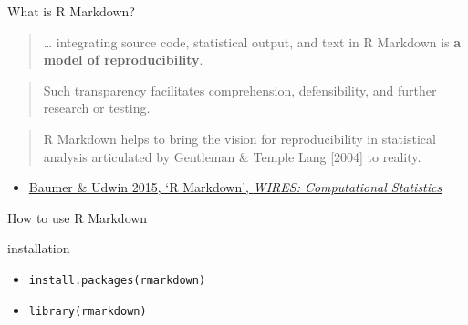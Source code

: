 \begin{frame}{What is R Markdown?}

\begin{quote}
\ldots{} integrating source code, statistical output, and text in R
Markdown is \textbf{a model of reproducibility}.
\end{quote}

\begin{quote}
Such transparency facilitates comprehension, defensibility, and further
research or testing.
\end{quote}

\begin{quote}
R Markdown helps to bring the vision for reproducibility in statistical
analysis articulated by Gentleman \& Temple Lang {[}2004{]} to reality.
\end{quote}

\begin{itemize}[<+->]
\itemsep1pt\parskip0pt
\item
  \href{http://onlinelibrary.wiley.com/doi/10.1002/wics.1348/abstract}{Baumer
  \& Udwin 2015, `R Markdown', \emph{WIRES: Computational Statistics}}
\end{itemize}

\end{frame}

\begin{frame}{How to use R Markdown}

\begin{block}{installation}

\begin{itemize}[<+->]
\itemsep1pt\parskip0pt
\item
  \texttt{install.packages(\textquotesingle{}rmarkdown\textquotesingle{})}
\item
  \texttt{library(rmarkdown)}
\end{itemize}

\end{block}

\end{frame}

